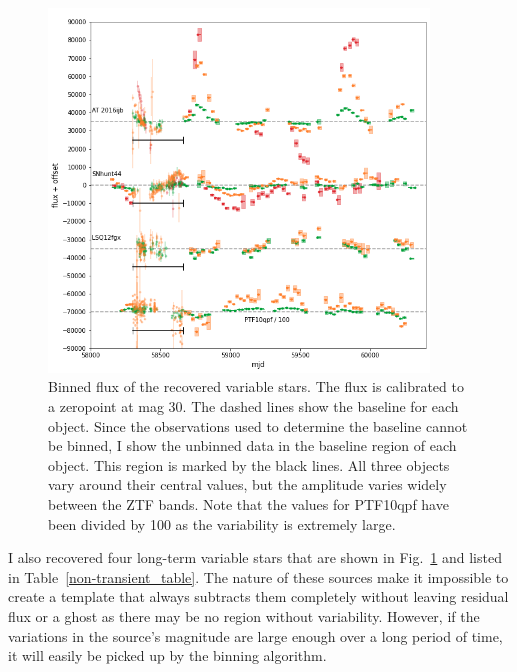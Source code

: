 \documentclass[a4paper,oneside,12pt, class=Latex/Classes/PhDthesisPSnPDF, crop=false]{standalone}
\begin{document}
\begin{figure}[h!]
    \centering
    \includegraphics[width=0.9\textwidth]{../Images/chapter_4/non-transients_varstar.png}
    \caption{Binned flux of the recovered variable stars. The flux is calibrated to a zeropoint at mag 30. The dashed lines show the baseline for each object. Since the observations used to determine the baseline cannot be binned, I show the unbinned data in the baseline region of each object. This region is marked by the black lines. All three objects vary around their central values, but the amplitude varies widely between the ZTF bands. Note that the values for PTF10qpf have been divided by 100 as the variability is extremely large.}
    \label{non-transients_varstar}
\end{figure}

I also recovered four long-term variable stars that are shown in Fig.~\ref{non-transients_varstar} and listed in Table~\ref{non-transient_table}. The nature of these sources make it impossible to create a template that always subtracts them completely without leaving residual flux or a ghost as there may be no region without variability. However, if the variations in the source's magnitude are large enough over a long period of time, it will easily be picked up by the binning algorithm.
\end{document}
